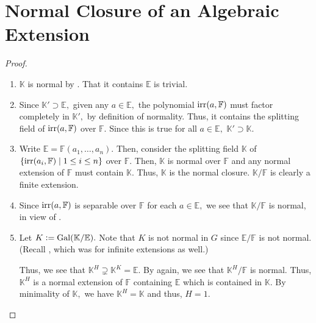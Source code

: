 \section{Normal Closure of an Algebraic Extension}
\normalclosureproperties*\label{prop:normalclosureproperties2}
\begin{flushright}\hyperref[prop:normalclosureproperties]{\upsym}\end{flushright}
\begin{proof}
    \phantom{hi}
    \begin{enumerate}
        \item $\mathbb{K}$ is normal by . That it contains $\mathbb{E}$ is trivial.
        \item Since $\mathbb{K}' \supset \mathbb{E},$ given any $a \in \mathbb{E},$ the polynomial $\operatorname{irr}(a, \mathbb{F})$ must factor completely in $\mathbb{K}',$ by definition of normality. Thus, it contains the splitting field of $\operatorname{irr}(a, \mathbb{F})$ over $\mathbb{F}.$ Since this is true for all $a \in \mathbb{E},$ $\mathbb{K}' \supset \mathbb{K}.$
        \item Write $\mathbb{E} = \mathbb{F}(a_1, \ldots, a_n).$ Then, consider the splitting field $\mathbb{K}$ of $\{\operatorname{irr}(a_i, \mathbb{F}) \mid 1 \le i \le n\}$ over $\mathbb{F}.$ Then, $\mathbb{K}$ is normal over $\mathbb{F}$ and any normal extension of $\mathbb{F}$ must contain $\mathbb{K}.$ Thus, $\mathbb{K}$ is the normal closure. $\mathbb{K}/\mathbb{F}$ is clearly a finite extension.
        \item Since $\operatorname{irr}(a, \mathbb{F})$ is separable over $\mathbb{F}$ for each $a \in \mathbb{E},$ we see that $\mathbb{K}/\mathbb{F}$ is normal, in view of .
        \item Let $K \vcentcolon= \operatorname{Gal}(\mathbb{K}/\mathbb{E}).$ Note that $K$ is not normal in $G$ since $\mathbb{E}/\mathbb{F}$ is not normal. (Recall , which was for infinite extensions as well.)

        Thus, we see that $\mathbb{K}^H \supsetneq \mathbb{K}^K = \mathbb{E}.$ By  again, we see that $\mathbb{K}^H/\mathbb{F}$ is normal. Thus, $\mathbb{K}^H$ is a normal extension of $\mathbb{F}$ containing $\mathbb{E}$ which is contained in $\mathbb{K}.$ By minimality of $\mathbb{K},$ we have $\mathbb{K}^H = \mathbb{K}$ and thus, $H = 1.$
    \end{enumerate}
\end{proof}


